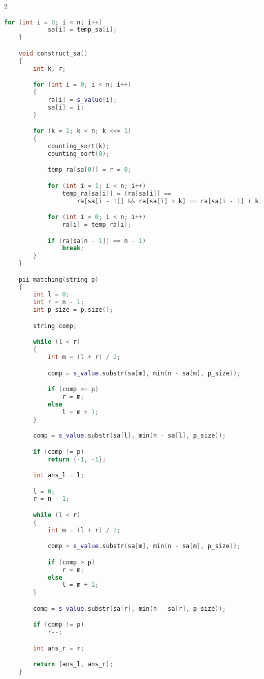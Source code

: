 \documentclass[leter]{amsart}
\begin{document}
\begin{multicols}{2}
\begin{lstlisting}[language=C++]
        for (int i = 0; i < n; i++)
            sa[i] = temp_sa[i];
    }

    void construct_sa()
    {
        int k, r;

        for (int i = 0; i < n; i++)
        {
            ra[i] = s_value[i];
            sa[i] = i;
        }

        for (k = 1; k < n; k <<= 1)
        {
            counting_sort(k);
            counting_sort(0);

            temp_ra[sa[0]] = r = 0;

            for (int i = 1; i < n; i++)
                temp_ra[sa[i]] = (ra[sa[i]] == 
                    ra[sa[i - 1]] && ra[sa[i] + k] == ra[sa[i - 1] + k]) ? r : ++r;

            for (int i = 0; i < n; i++)
                ra[i] = temp_ra[i];

            if (ra[sa[n - 1]] == n - 1)
                break;
        }
    }

    pii matching(string p)
    {
        int l = 0;
        int r = n - 1;
        int p_size = p.size();

        string comp;

        while (l < r)
        {
            int m = (l + r) / 2;

            comp = s_value.substr(sa[m], min(n - sa[m], p_size));

            if (comp >= p)
                r = m;
            else
                l = m + 1;
        }

        comp = s_value.substr(sa[l], min(n - sa[l], p_size));

        if (comp != p)
            return {-1, -1};

        int ans_l = l;

        l = 0;
        r = n - 1;

        while (l < r)
        {
            int m = (l + r) / 2;

            comp = s_value.substr(sa[m], min(n - sa[m], p_size));

            if (comp > p)
                r = m;
            else
                l = m + 1;
        }

        comp = s_value.substr(sa[r], min(n - sa[r], p_size));

        if (comp != p)
            r--;

        int ans_r = r;

        return {ans_l, ans_r};
    }


\end{lstlisting}
\end{multicols}
\end{document}
